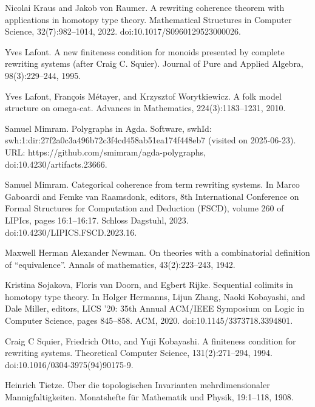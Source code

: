 \par\noindent  [10]  Nicolai Kraus and Jakob von Raumer.  A rewriting coherence theorem with applications in homotopy type theory.  Mathematical Structures in Computer Science, 32(7):982–1014, 2022.  doi:10.1017/S0960129523000026.  
 
\par\noindent  [11]  Yves Lafont.  A new finiteness condition for monoids presented by complete rewriting systems (after Craig C. Squier).  Journal of Pure and Applied Algebra, 98(3):229–244, 1995.  
 
\par\noindent  [12]  Yves Lafont, François Métayer, and Krzysztof Worytkiewicz.  A folk model structure on omega-cat.  Advances in Mathematics, 224(3):1183–1231, 2010.  
 
\par\noindent  [13]  Samuel Mimram.  Polygraphs in Agda.  Software, swhId: swh:1:dir:27f2a0c3a496b72c3f4cd458ab51ea174f448eb7 (visited on 2025-06-23).  URL: https://github.com/smimram/agda-polygraphs, doi:10.4230/artifacts.23666.  
 
\par\noindent  [14]  Samuel Mimram.  Categorical coherence from term rewriting systems.  In Marco Gaboardi and Femke van Raamsdonk, editors, 8th International Conference on Formal Structures for Computation and Deduction (FSCD), volume 260 of LIPIcs, pages 16:1–16:17. Schloss Dagstuhl, 2023.  doi:10.4230/LIPICS.FSCD.2023.16.  
 
\par\noindent  [15]  Maxwell Herman Alexander Newman.  On theories with a combinatorial definition of “equivalence”.  Annals of mathematics, 43(2):223–243, 1942.  
 
\par\noindent  [16]  Kristina Sojakova, Floris van Doorn, and Egbert Rijke.  Sequential colimits in homotopy type theory.  In Holger Hermanns, Lijun Zhang, Naoki Kobayashi, and Dale Miller, editors, LICS ’20: 35th Annual ACM/IEEE Symposium on Logic in Computer Science, pages 845–858. ACM, 2020.  doi:10.1145/3373718.3394801.  
 
\par\noindent  [17]  Craig C Squier, Friedrich Otto, and Yuji Kobayashi.  A finiteness condition for rewriting systems.  Theoretical Computer Science, 131(2):271–294, 1994.  doi:10.1016/0304-3975(94)90175-9.  
 
\par\noindent  [18]  Heinrich Tietze.  Über die topologischen Invarianten mehrdimensionaler Mannigfaltigkeiten.  Monatshefte für Mathematik und Physik, 19:1–118, 1908.  
 
